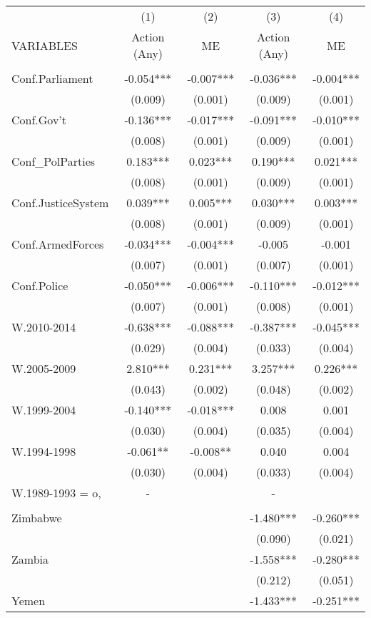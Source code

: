 \documentclass[]{article}
\begin{document}
\begin{tabular}{lcccc} \hline
 & (1) & (2) & (3) & (4) \\
VARIABLES & Action (Any) & ME & Action (Any) & ME \\ \hline
 &  &  &  &  \\
Conf.Parliament & -0.054*** & -0.007*** & -0.036*** & -0.004*** \\
 & (0.009) & (0.001) & (0.009) & (0.001) \\
Conf.Gov't & -0.136*** & -0.017*** & -0.091*** & -0.010*** \\
 & (0.008) & (0.001) & (0.009) & (0.001) \\
Conf\_PolParties & 0.183*** & 0.023*** & 0.190*** & 0.021*** \\
 & (0.008) & (0.001) & (0.009) & (0.001) \\
Conf.JusticeSystem & 0.039*** & 0.005*** & 0.030*** & 0.003*** \\
 & (0.008) & (0.001) & (0.009) & (0.001) \\
Conf.ArmedForces & -0.034*** & -0.004*** & -0.005 & -0.001 \\
 & (0.007) & (0.001) & (0.007) & (0.001) \\
Conf.Police & -0.050*** & -0.006*** & -0.110*** & -0.012*** \\
 & (0.007) & (0.001) & (0.008) & (0.001) \\
W.2010-2014 & -0.638*** & -0.088*** & -0.387*** & -0.045*** \\
 & (0.029) & (0.004) & (0.033) & (0.004) \\
W.2005-2009 & 2.810*** & 0.231*** & 3.257*** & 0.226*** \\
 & (0.043) & (0.002) & (0.048) & (0.002) \\
W.1999-2004 & -0.140*** & -0.018*** & 0.008 & 0.001 \\
 & (0.030) & (0.004) & (0.035) & (0.004) \\
W.1994-1998 & -0.061** & -0.008** & 0.040 & 0.004 \\
 & (0.030) & (0.004) & (0.033) & (0.004) \\
W.1989-1993 = o, & - &  & - &  \\
 &  &  &  &  \\
Zimbabwe &  &  & -1.480*** & -0.260*** \\
 &  &  & (0.090) & (0.021) \\
Zambia &  &  & -1.558*** & -0.280*** \\
 &  &  & (0.212) & (0.051) \\
Yemen &  &  & -1.433*** & -0.251*** \\

\end{tabular}
\end{document}
